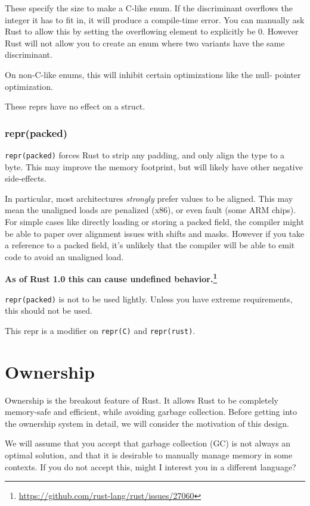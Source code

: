 \documentclass[a4paper,]{book}
\renewcommand{\href}[2]{#2\footnote{\url{#1}}}
\begin{document}
These specify the size to make a C-like enum. If the discriminant
overflows the integer it has to fit in, it will produce a compile-time
error. You can manually ask Rust to allow this by setting the
overflowing element to explicitly be 0. However Rust will not allow you
to create an enum where two variants have the same discriminant.

On non-C-like enums, this will inhibit certain optimizations like the
null- pointer optimization.

These reprs have no effect on a struct.

\subsection{repr(packed)}\label{reprpacked}

\texttt{repr(packed)} forces Rust to strip any padding, and only align
the type to a byte. This may improve the memory footprint, but will
likely have other negative side-effects.

In particular, most architectures \emph{strongly} prefer values to be
aligned. This may mean the unaligned loads are penalized (x86), or even
fault (some ARM chips). For simple cases like directly loading or
storing a packed field, the compiler might be able to paper over
alignment issues with shifts and masks. However if you take a reference
to a packed field, it's unlikely that the compiler will be able to emit
code to avoid an unaligned load.

\textbf{\href{https://github.com/rust-lang/rust/issues/27060}{As of Rust
1.0 this can cause undefined behavior.}}

\texttt{repr(packed)} is not to be used lightly. Unless you have extreme
requirements, this should not be used.

This repr is a modifier on \texttt{repr(C)} and \texttt{repr(rust)}.

\hypertarget{sec--ownership}{\chapter{Ownership}\label{sec--ownership}}

Ownership is the breakout feature of Rust. It allows Rust to be
completely memory-safe and efficient, while avoiding garbage collection.
Before getting into the ownership system in detail, we will consider the
motivation of this design.

We will assume that you accept that garbage collection (GC) is not
always an optimal solution, and that it is desirable to manually manage
memory in some contexts. If you do not accept this, might I interest you
in a different language?
\end{document}
